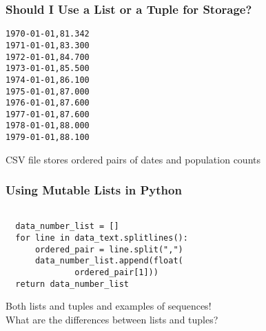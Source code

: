 \documentclass[14pt,aspectratio=169]{beamer}
\begin{document}
%
\begin{frame}[fragile]
  \frametitle{Should I Use a List or a Tuple for Storage?}
  \begin{minipage}{6in}
    \vspace*{.15in}
    \begin{verbatim}
1970-01-01,81.342
1971-01-01,83.300
1972-01-01,84.700
1973-01-01,85.500
1974-01-01,86.100
1975-01-01,87.000
1976-01-01,87.600
1977-01-01,87.600
1978-01-01,88.000
1979-01-01,88.100
    \end{verbatim}
  \end{minipage}
  \vspace*{.05in}
  \begin{center}
    \normalsize \noindent CSV file stores ordered pairs of dates and
    population counts\\
  \end{center}
\end{frame}

%
\begin{frame}[fragile]
  \frametitle{Using Mutable Lists in Python}
  \begin{minipage}{6in}
    \vspace*{.15in}
    \begin{verbatim}

  data_number_list = []
  for line in data_text.splitlines():
      ordered_pair = line.split(",")
      data_number_list.append(float(
              ordered_pair[1]))
  return data_number_list

    \end{verbatim}
  \end{minipage}
  \vspace*{.025in}
  \begin{center}
    \normalsize \noindent Both lists and tuples and examples of sequences! \\
    \normalsize \noindent What are the differences between lists and tuples? \\
  \end{center}
\end{frame}
\end{document}
